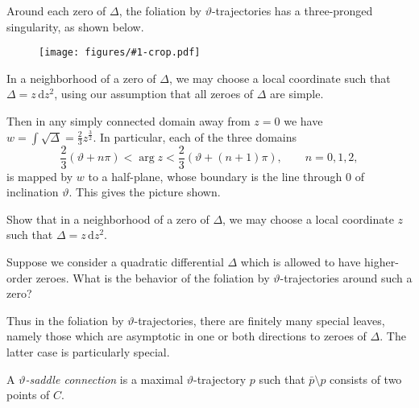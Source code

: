 \documentclass[12pt,letterpaper,reqno]{article}
\numberwithin{equation}{section}
\newcommand{\de}{\mathrm{d}}
\newcommand{\ti}[1]{\textit{#1}}
\newcommand{\insfig}[2]{\begin{figure}[htbp] \centering \texttt{[image: figures/\#1-crop.pdf]} \label{fig:#1} \end{figure}}
\begin{document}
\begin{prop} Around each zero of $\Delta$, the foliation
by $\vartheta$-trajectories has a three-pronged singularity,
as shown below.
\insfig{higgs-bundles-18}{0.8}
\end{prop}
\begin{pf} In a neighborhood of a zero of $\Delta$, we may choose a 
local coordinate such that $\Delta = z\,\de z^2$, using our assumption that
all zeroes of $\Delta$ are simple.

Then in any simply connected domain away from $z=0$ we have
$w = \int \sqrt{\Delta} = \frac23 z^{\frac32}$. In particular,
each of the three domains 
\begin{equation}
\frac23 (\vartheta + n\pi) < \arg z < \frac23 (\vartheta + (n+1)\pi),	\qquad n=0,1,2,
\end{equation}
is mapped by $w$ to a half-plane, 
whose boundary is the line through $0$ of inclination $\vartheta$.
This gives the picture shown.
\end{pf}

\begin{exercise} Show that in a neighborhood of a zero of $\Delta$, we may choose a 
local coordinate $z$ such that $\Delta = z\,\de z^2$.
\end{exercise}

\begin{exercise} Suppose we consider a quadratic differential $\Delta$
which is allowed to have higher-order zeroes. What is the behavior of
the foliation by $\vartheta$-trajectories around such a zero?
\end{exercise}

Thus in the foliation by $\vartheta$-trajectories, there are finitely
many special leaves, namely those which are asymptotic in one or
both directions to zeroes of $\Delta$. The latter case is particularly
special.

\begin{defn}
A \ti{$\vartheta$-saddle connection} is a maximal
$\vartheta$-trajectory $p$
such that $\bar p \setminus p$ consists of two points of $C$.
\end{defn}
\end{document}
